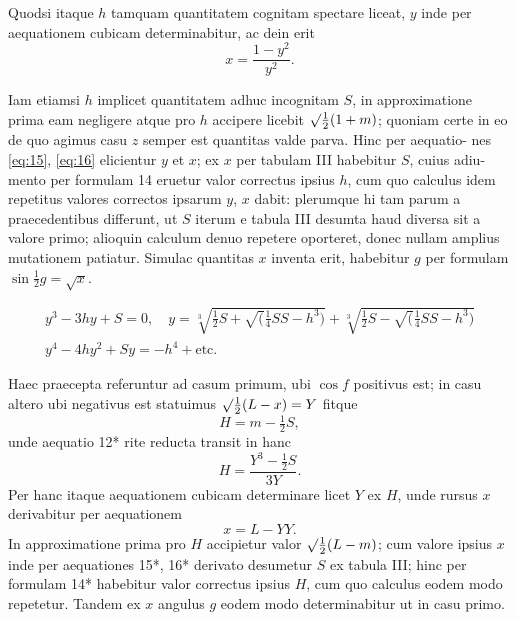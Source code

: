 \documentclass[12pt,a4paper]{article}
\begin{document}
Quodsi itaque $h$ tamquam quantitatem cognitam spectare liceat, $y$ inde per
aequationem cubicam determinabitur, ac dein erit
\begin{equation}
\label{eq:16}
x = \frac{1 - y^2}{y^2}.
\end{equation}

Iam etiamsi $h$ implicet quantitatem adhuc incognitam $S$, in approximatione
prima eam negligere atque pro $h$ accipere licebit $\surd\frac{1}{2}(1 + m)$; quoniam certe in eo
de quo agimus casu $z$ semper est quantitas valde parva. Hinc per aequatio-
nes \eqref{eq:15}, \eqref{eq:16} elicientur $y$ et $x$; ex $x$ per tabulam III habebitur $S$, cuius adiu-
mento per formulam 14 eruetur valor correctus ipsius $h$, cum quo calculus
idem repetitus valores correctos ipsarum $y$, $x$ dabit: plerumque hi tam parum
a praecedentibus differunt, ut $S$ iterum e tabula III desumta haud diversa sit
a valore primo; alioquin calculum denuo repetere oporteret, donec nullam
amplius mutationem patiatur. Simulac quantitas $x$ inventa erit, habebitur $g$
per formulam $\sin\tfrac{1}{2}g = \surd x$.

\begin{gather*}
y^3 - 3hy + S = 0, \quad y = \sqrt[3]{\tfrac{1}{2}S + \surd(\tfrac{1}{4}SS - h^3)} + \sqrt[3]{\tfrac{1}{2}S - \surd(\tfrac{1}{4}SS - h^3)} \\
y^4 - 4hy^2 + Sy = -h^4 + \text{etc.}
\end{gather*}

Haec praecepta referuntur ad casum primum, ubi $\cos f$ positivus est; in
casu altero ubi negativus est statuimus $\surd\tfrac{1}{2}(L - x) = Y$ fitque
\begin{equation}\tag{14*}
H = m - \tfrac{1}{2}S,
\end{equation}
unde aequatio 12* rite reducta transit in hanc
\begin{equation}\tag{15*}
H = \frac{Y^3 - \tfrac{1}{2}S}{3Y}.
\end{equation}
Per hanc itaque aequationem cubicam determinare licet $Y$ ex $H$, unde rursus
$x$ derivabitur per aequationem
\begin{equation}\tag{16*}
x = L - YY.
\end{equation}
In approximatione prima pro $H$ accipietur valor $\surd\frac{1}{2}(L - m)$; cum valore ipsius $x$
inde per aequationes 15*, 16* derivato desumetur $S$ ex tabula III; hinc per
formulam 14* habebitur valor correctus ipsius $H$, cum quo calculus eodem modo
repetetur. Tandem ex $x$ angulus $g$ eodem modo determinabitur ut in casu primo.
\end{document}
